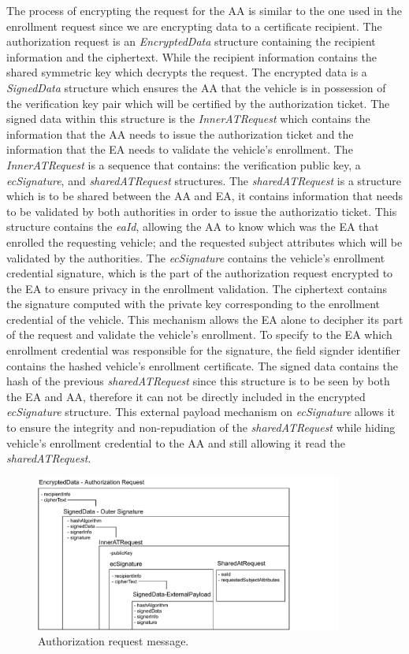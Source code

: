 The process of encrypting the request for the AA is similar to the one used in the enrollment request since we are encrypting data to a certificate recipient. The authorization request is an \textit{EncryptedData} structure containing the recipient information and the ciphertext. While the recipient information contains the shared symmetric key which decrypts the request. The encrypted data is a \textit{SignedData} structure which ensures the AA that the vehicle is in possession of the verification key pair which will be certified by the authorization ticket. The signed data within this structure is the \textit{InnerATRequest} which contains the information that the AA needs to issue the authorization ticket and the information that the EA needs to validate the vehicle's enrollment. The \textit{InnerATRequest} is a sequence that contains: the verification public key, a \textit{ecSignature}, and \textit{sharedATRequest} structures. The \textit{sharedATRequest} is a structure which is to be shared between the AA and EA, it contains information that needs to be validated by both authorities in order to issue the authorizatio ticket. This structure contains the \textit{eaId}, allowing the AA to know which was the EA that enrolled the requesting vehicle; and the requested subject attributes which will be validated by the authorities. The \textit{ecSignature} contains the vehicle's enrollment credential signature, which is the part of the authorization request encrypted to the EA to ensure privacy in the enrollment validation. The ciphertext contains the signature computed with the private key corresponding to the enrollment credential of the vehicle. This mechanism allows the EA alone to decipher its part of the request and validate the vehicle's enrollment. To specify to the EA which enrollment credential was responsible for the signature, the field signder identifier contains the hashed vehicle's enrollment certificate. The signed data contains the hash of the previous \textit{sharedATRequest} since this structure is to be seen by both the EA and AA, therefore it can not be directly included in the encrypted \textit{ecSignature} structure. This external payload mechanism on \textit{ecSignature} allows it to ensure the integrity and non-repudiation of the \textit{sharedATRequest} while hiding vehicle's enrollment credential to the AA and still allowing it read the \textit{sharedATRequest}. 

\begin{figure}
	\centering
	\includegraphics[width=0.9\textwidth]{Figures/authorizationrequest}
	\caption{\label{fig:authorization_request}Authorization request message.}
\end{figure}

